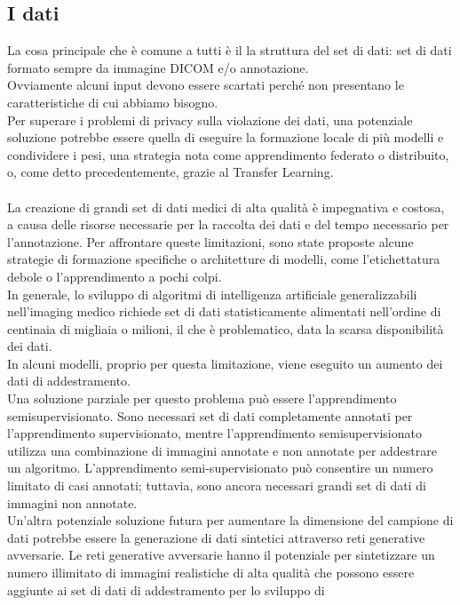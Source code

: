 \documentclass[12pt,a4paper]{report}
\begin{document}
\subsection{I dati}
La cosa principale che è comune a tutti è il la struttura del set di dati: set di dati formato sempre da immagine DICOM e/o annotazione.\\
Ovviamente alcuni input devono essere scartati perché non presentano le caratteristiche di cui abbiamo bisogno.\\
Per superare i problemi di privacy sulla violazione dei dati, una potenziale soluzione potrebbe essere quella di eseguire la formazione locale di più modelli e condividere i pesi, una strategia nota come apprendimento federato o distribuito, o, come detto precedentemente, grazie al Transfer Learning.\\
\\
La creazione di grandi set di dati medici di alta qualità è impegnativa e costosa, a causa delle risorse necessarie per la raccolta dei dati e del tempo necessario per l'annotazione. Per affrontare queste limitazioni, sono state proposte alcune strategie di formazione specifiche o architetture di modelli, come l'etichettatura debole o l'apprendimento a pochi colpi.
\\
In generale, lo sviluppo di algoritmi di intelligenza artificiale generalizzabili nell'imaging medico richiede set di dati statisticamente alimentati nell'ordine di centinaia di migliaia o milioni, il che è problematico, data la scarsa disponibilità
dei dati.\\
In alcuni modelli, proprio per questa limitazione, viene eseguito un aumento dei dati di addestramento.\\
Una soluzione parziale per questo problema può essere l'apprendimento semisupervisionato. Sono necessari
set di dati completamente annotati per l'apprendimento supervisionato, mentre l'apprendimento semisupervisionato
utilizza una combinazione di immagini annotate e non annotate per addestrare un algoritmo.
L'apprendimento semi-supervisionato può consentire un numero limitato di casi annotati; tuttavia, sono ancora 
necessari grandi set di dati di immagini non annotate.\\
Un'altra potenziale soluzione futura per aumentare la dimensione del campione di dati potrebbe essere la generazione di dati 
sintetici attraverso reti generative avversarie. Le reti generative avversarie hanno il potenziale per sintetizzare un numero
illimitato di immagini realistiche di alta qualità che possono essere aggiunte ai set di dati di addestramento per lo sviluppo di 
\end{document}
